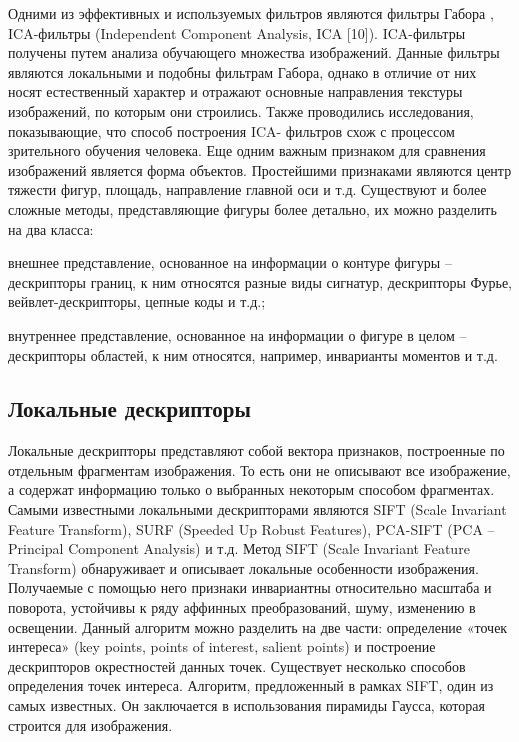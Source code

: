 Одними из эффективных и используемых фильтров являются фильтры Габора
, ICA-фильтры (Independent Component Analysis, ICA [10]). ICA-фильтры получены
путем анализа обучающего множества изображений. Данные фильтры являются
локальными и подобны фильтрам Габора, однако в отличие от них носят естественный
характер и отражают основные направления текстуры изображений, по которым они
строились. Также проводились исследования, показывающие, что способ построения ICA-
фильтров схож с процессом зрительного обучения человека.
Еще одним важным признаком для сравнения изображений является форма
объектов. Простейшими признаками являются центр тяжести фигур, площадь,
направление главной оси и т.д. Существуют и более сложные методы, представляющие
фигуры более детально, их можно разделить на два класса:
\begin{compactitem}
\item  внешнее представление, основанное на информации о контуре фигуры –
дескрипторы границ, к ним относятся разные виды сигнатур, дескрипторы
Фурье, вейвлет-дескрипторы, цепные коды и т.д.;
\item  внутреннее представление, основанное на информации о фигуре в целом –
дескрипторы областей, к ним относятся, например, инварианты моментов и т.д.
\end{compactitem}

\subsection{Локальные дескрипторы}

Локальные дескрипторы представляют собой вектора признаков, построенные по
отдельным фрагментам изображения. То есть они не описывают все изображение, а
содержат информацию только о выбранных некоторым способом фрагментах. Самыми
известными локальными дескрипторами являются SIFT \cite{lowe1999sift} (Scale Invariant Feature
Transform), SURF \cite{bay2006surf} (Speeded Up Robust Features), PCA-SIFT \cite{ke2004pcasift} (PCA – Principal
Component Analysis) и т.д.
Метод SIFT (Scale Invariant Feature Transform) обнаруживает и описывает
локальные особенности изображения. Получаемые с помощью него признаки
инвариантны относительно масштаба и поворота, устойчивы к ряду аффинных
преобразований, шуму, изменению в освещении. Данный алгоритм можно разделить на
две части: определение «точек интереса» (key points, points of interest, salient points) и построение дескрипторов окрестностей данных точек. Существует несколько способов
определения точек интереса. Алгоритм, предложенный в рамках SIFT, один из самых
известных. Он заключается в использования пирамиды Гаусса, которая строится для
изображения.


